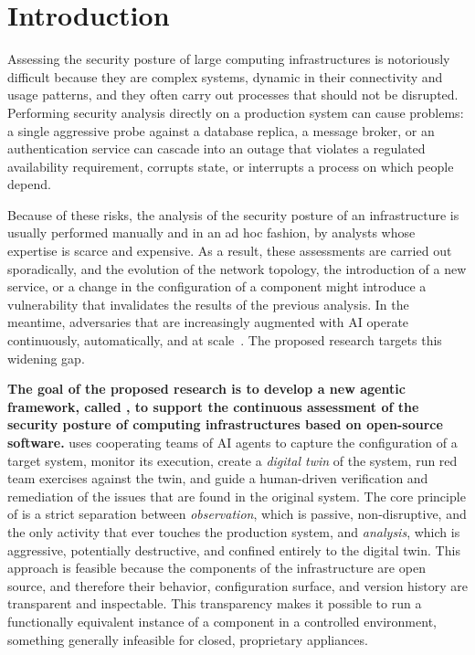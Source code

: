\section{Introduction}
\label{sec:intro}

Assessing the security posture of large computing infrastructures is
notoriously difficult because they are complex systems, dynamic in their
connectivity and usage patterns, and they often carry out processes that
should not be disrupted. Performing security analysis directly on a
production system can cause problems: a single aggressive probe against a
database replica, a message broker, or an authentication service can cascade
into an outage that violates a regulated availability requirement, corrupts
state, or interrupts a process on which people depend.

Because of these risks, the analysis of the security posture of an
infrastructure is usually performed manually and in an ad hoc fashion, by
analysts whose expertise is scarce and expensive. As a result, these
assessments are carried out sporadically, and the evolution of the network
topology, the introduction of a new service, or a change in the configuration
of a component might introduce a vulnerability that invalidates the results
of the previous analysis. In the meantime, adversaries that are increasingly
augmented with AI operate continuously, automatically, and at
scale~\cite{measuring}. The proposed research targets this widening gap.

\textbf{The goal of the proposed research is to develop a new agentic
framework, called \sysname, to support the continuous assessment of the
security posture of computing infrastructures based on open-source
software.} \sysname uses cooperating teams of AI agents to capture the
configuration of a target system, monitor its execution, create a
\emph{digital twin} of the system, run red team exercises against the twin,
and guide a human-driven verification and remediation of the issues that are
found in the original system. The core principle of \sysname is a strict
separation between \emph{observation}, which is passive, non-disruptive, and
the only activity that ever touches the production system, and
\emph{analysis}, which is aggressive, potentially destructive, and confined
entirely to the digital twin. This approach is feasible because the components of the infrastructure are
open source, and therefore their behavior, configuration surface, and version
history are transparent and inspectable. This transparency makes it possible to run a
functionally equivalent instance of a component in a controlled environment,
something generally infeasible for closed, proprietary appliances.

